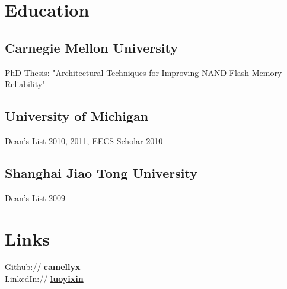 \documentclass[]{resume}
\begin{document}
%
%
\lastupdated%

%
%

%
%

\begin{minipage}[t]{0.377\textwidth}


\section{Education}

\subsection{Carnegie Mellon University}
PhD Thesis: "Architectural Techniques for Improving NAND Flash Memory Reliability"
\sectionsep%

\subsection{University of Michigan}
Dean's List 2010, 2011, EECS Scholar 2010 \\
\sectionsep%

\subsection{Shanghai Jiao Tong University}
Dean's List 2009 \\



\section{Links}
Github:// \href{https://github.com/camellyx}{\bf camellyx} \\
LinkedIn:// \href{https://www.linkedin.com/in/luoyixin}{\bf luoyixin} \\


\end{minipage}
\end{document}
